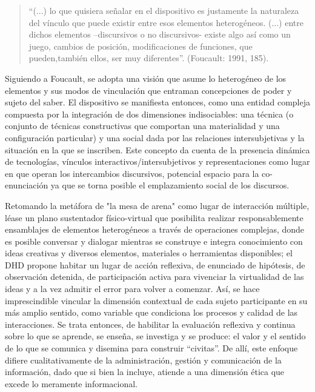      
\begin{quote} 
      “(...) lo que quisiera señalar en el dispositivo es justamente la
      naturaleza del vínculo que puede existir entre esos elementos
      heterogéneos. (...) entre dichos elementos –discursivos o no
      discursivos- existe algo así como un juego, cambios de posición,
      modificaciones de funciones, que pueden,también ellos, ser muy
      diferentes”. (Foucault: 1991, 185).
\end{quote} 

Siguiendo a Foucault, se adopta una visión que asume lo heterogéneo de los
elementos y sus modos de vinculación que entraman concepciones de
poder y sujeto del saber. El dispositivo se manifiesta entonces, como una
entidad compleja compuesta por la integración de dos dimensiones
indisociables: una técnica (o conjunto de técnicas constructivas que
comportan una materialidad y una configuración particular) y una social
dada por las relaciones intersubjetivas y la situación en la que se
inscriben. Este concepto da cuenta de la presencia dinámica de tecnologías, vínculos
interactivos/intersubjetivos y representaciones como lugar en que operan los
intercambios discursivos, potencial espacio para la co-enunciación ya
que se torna posible el emplazamiento social de los discursos.

Retomando la metáfora de "la mesa de arena" como lugar de interacción múltiple, léase un plano sustentador
físico-virtual que posibilita realizar responsablemente ensamblajes de elementos
heterogéneos a través de operaciones complejas, donde es posible conversar y
dialogar mientras se construye e integra conocimiento con ideas
creativas y diversos elementos, materiales o herramientas disponibles;
el DHD propone habitar un lugar de acción reflexiva, de enunciado de
hipótesis, de observación detenida, de participación activa para vivenciar
la virtualidad de las ideas y a la vez admitir el error para volver a
comenzar. Así, se hace imprescindible vincular la dimensión contextual de
cada sujeto participante en su más amplio sentido, como variable que
condiciona los procesos y calidad de las interacciones. Se trata entonces,
de habilitar la evaluación reflexiva y continua sobre lo que se aprende, se
enseña, se investiga y se produce: el valor y el sentido de lo que se
comunica y disemina para construir “civitas”. De allí, este enfoque
difiere cualitativamente de la administración, gestión y comunicación de la
información, dado que si bien la incluye, atiende a una dimensión ética que
excede lo meramente informacional.

